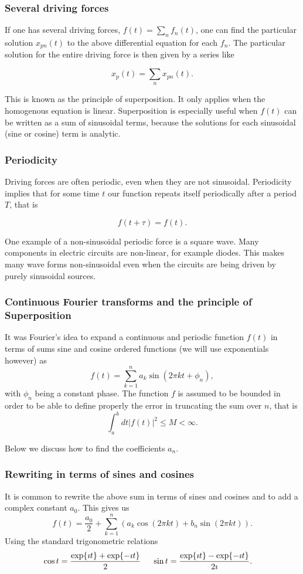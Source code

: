 \documentclass{beamer}
\begin{document}
\begin{frame}
\frametitle{Several driving forces}

If one has several driving forces, $f(t)=\sum_n f_n(t)$, one can find
the particular solution $x_{pn}(t)$ to the above differential equation for each $f_n$. The particular
solution for the entire driving force is then given by a series like

\[
x_p(t)=\sum_nx_{pn}(t).
\]

This is known as the principle of superposition. It only applies when
the homogenous equation is linear. 
Superposition is especially useful when $f(t)$ can be written
as a sum of sinusoidal terms, because the solutions for each
sinusoidal (sine or cosine)  term is analytic.
\end{frame}

\begin{frame}
\frametitle{Periodicity}

Driving forces are often periodic, even when they are not
sinusoidal. Periodicity implies that for some time $t$ our function repeats itself periodically after a period $T$, that is

\[
f(t+\tau)=f(t). 
\]

One example of a non-sinusoidal periodic force is a square wave. Many
components in electric circuits are non-linear, for example diodes. This 
makes many wave forms non-sinusoidal even when the circuits are being
driven by purely sinusoidal sources.
\end{frame}

\begin{frame}
\frametitle{Continuous Fourier transforms and the principle of Superposition}

It was Fourier's idea to expand a continuous and periodic function $f(t)$ in terms of sums sine and cosine ordered functions (we will use exponentials however)
as
\[
f(t) = \sum_{k=1}^{n}a_k\sin{(2\pi kt+\phi_n)},
\]
with $\phi_n$ being a constant phase. The function $f$ is assumed to be bounded in order to be able to define properly the error in truncating the sum
over $n$, that is
\[
\int_a^b dt \vert f(t)\vert^2 \le M < \infty.
\]

Below we discuss how to find the coefficients $a_n$.
\end{frame}

\begin{frame}
\frametitle{Rewriting in terms of sines and cosines}

It is common to rewrite the above sum in terms of sines and cosines and to add a complex constant $a_0$. This gives us
\[
f(t) = \frac{a_0}{2}+ \sum_{k=1}^{n}\left(a_k\cos{(2\pi kt)}+b_n\sin{(2\pi kt)}\right).
\]
Using the standard trigonometric relations
\begin{align*}
\cos{t} = \frac{\exp{\imath t}+\exp{-\imath t}}{2} & \hspace{0.5cm} \sin{t} = \frac{\exp{\imath t}-\exp{-\imath t}}{2\imath}.
\end{align*}
\end{frame}
\end{document}
